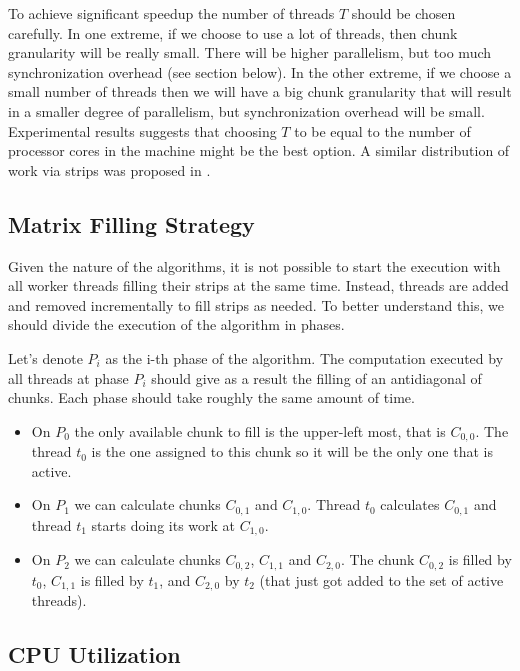 \documentclass[journal]{IEEEtran}
\begin{document}
To achieve significant speedup the number of threads $T$ should be chosen carefully. In one extreme, if we choose to use a lot of threads, then chunk granularity will be really small. There will be higher parallelism, but too much synchronization overhead (see section below). In the other extreme, if we choose a small number of threads then we will have a big chunk granularity that will result in a smaller degree of parallelism, but synchronization overhead will be small. Experimental results suggests that choosing $T$ to be equal to the number of processor cores in the machine might be the best option. A similar distribution of work via strips was proposed in \cite{martins2001multithreaded}.

\subsection{Matrix Filling Strategy}

Given the nature of the algorithms, it is not possible to start the execution with all worker threads filling their strips at the same time. Instead, threads are added and removed incrementally to fill strips as needed. To better understand this, we should divide the execution of the algorithm in phases.

Let's denote $P_i$ as the i-th phase of the algorithm. The computation executed by all threads at phase $P_i$ should give as a result the filling of an antidiagonal of chunks. Each phase should take roughly the same amount of time.

\begin{itemize}
    \item On $P_0$ the only available chunk to fill is the upper-left most, that is $C_{0,0}$. The thread $t_0$ is the one assigned to this chunk so it will be the only one that is active.
    \item On $P_1$ we can calculate chunks $C_{0,1}$ and $C_{1, 0}$. Thread $t_0$ calculates $C_{0,1}$ and thread $t_1$ starts doing its work at $C_{1, 0}$.
    \item On $P_2$ we can calculate chunks $C_{0, 2}$, $C_{1,1}$ and $C_{2,0}$. The chunk $C_{0, 2}$ is filled by $t_0$, $C_{1,1}$ is filled by $t_1$, and $C_{2,0}$ by $t_2$ (that just got added to the set of active threads).
\end{itemize}

\subsection{CPU Utilization}
\end{document}
